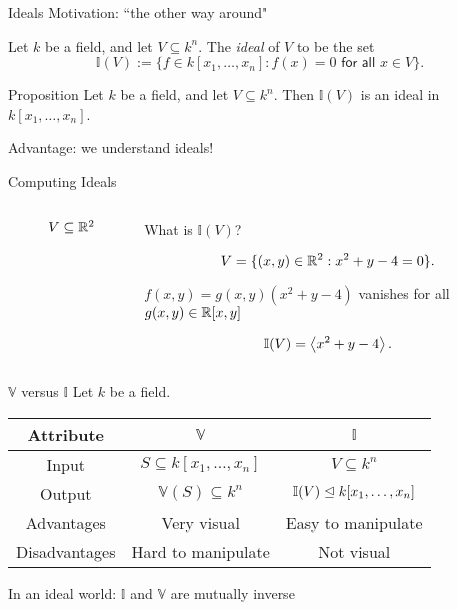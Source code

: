 \documentclass{beamer}
\newcommand{\V}{\mathbb V}
\newcommand{\I}{\mathbb I}
\begin{document}
\begin{frame}{Ideals}
Motivation: ``the other way around" \pause

\begin{definition}
Let $k$ be a field, and let $V\subseteq k^n$. The \textit{ideal} of $V$ to be the set
$$\I(V) := \{f\in k[x_1,\ldots, x_n]: f(x) = 0 \textsf{ for all } x\in V\}.$$
\end{definition}\pause
\begin{block}{Proposition}
Let $k$ be a field, and let $V\subseteq k^n$. Then $\I(V)$ is an ideal in $k[x_1, \ldots, x_n]$.
\end{block}
\pause\vspace{0.2 cm}

Advantage: we understand ideals!
\end{frame}
\begin{frame}{Computing Ideals}
\begin{columns}
\begin{column}{0.48\textwidth}
\begin{figure}[h!]
\centering
{}
\caption{$V\subseteq\mathbb R^2$}
\end{figure}
\end{column}
\begin{column}{0.48\textwidth}
What is $\I(V)$? \pause

$$V = \{(x,y)\in\mathbb R^2: x^2+y-4=0\}.$$ \pause

$f(x,y) = g(x,y)(x^2+y-4)$ vanishes for all $g(x,y)\in \mathbb R[x,y]$ \pause

$$\I(V) = \gen{x^2+y-4}.$$
\end{column}
\end{columns}
\end{frame}
\begin{frame}{$\V$ versus $\I$}
Let $k$ be a field.
\begin{center}
\def\arraystretch{1.2}
\begin{tabular}{c|c|c}
Attribute  &  $\V$ & $\I$  \\\hline \pause
Input & $S\subseteq k[x_1,\ldots, x_n]$ & $V\subseteq k^n$ \\ \pause
Output & $\V(S)\subseteq k^n$ & $\I(V) \furina k[x_1, \ldots, x_n]$ \\ \pause
Advantages & Very visual & Easy to manipulate \\ \pause
Disadvantages & Hard to manipulate & Not visual \\
\end{tabular}
\end{center}\pause
In an ideal world: $\I$ and $\V$ are mutually inverse
\end{frame}
\end{document}
